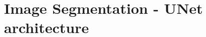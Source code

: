 \documentclass{standalone}
\begin{document}
\section[UNet]{Image Segmentation - UNet architecture}\label{unet}

\end{document}
